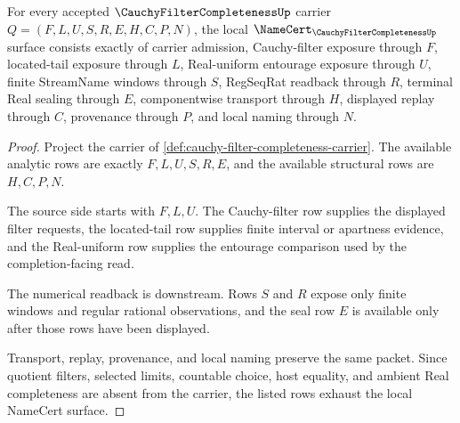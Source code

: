 \begin{theorem}
\label{thm:cauchy-filter-completeness-namecert-obligations}
For every accepted $\CauchyFilterCompletenessUp$ carrier $Q=(F,L,U,S,R,E,H,C,P,N)$, the local $\NameCert_{\CauchyFilterCompletenessUp}$ surface consists exactly of carrier admission, Cauchy-filter exposure through $F$, located-tail exposure through $L$, Real-uniform entourage exposure through $U$, finite StreamName windows through $S$, RegSeqRat readback through $R$, terminal Real sealing through $E$, componentwise transport through $H$, displayed replay through $C$, provenance through $P$, and local naming through $N$.
\end{theorem}
\begin{proof}
Project the carrier of \autoref{def:cauchy-filter-completeness-carrier}. The available analytic rows are exactly $F,L,U,S,R,E$, and the available structural rows are $H,C,P,N$.

The source side starts with $F,L,U$. The Cauchy-filter row supplies the displayed filter requests, the located-tail row supplies finite interval or apartness evidence, and the Real-uniform row supplies the entourage comparison used by the completion-facing read.

The numerical readback is downstream. Rows $S$ and $R$ expose only finite windows and regular rational observations, and the seal row $E$ is available only after those rows have been displayed.

Transport, replay, provenance, and local naming preserve the same packet. Since quotient filters, selected limits, countable choice, host equality, and ambient Real completeness are absent from the carrier, the listed rows exhaust the local NameCert surface.
\end{proof}

